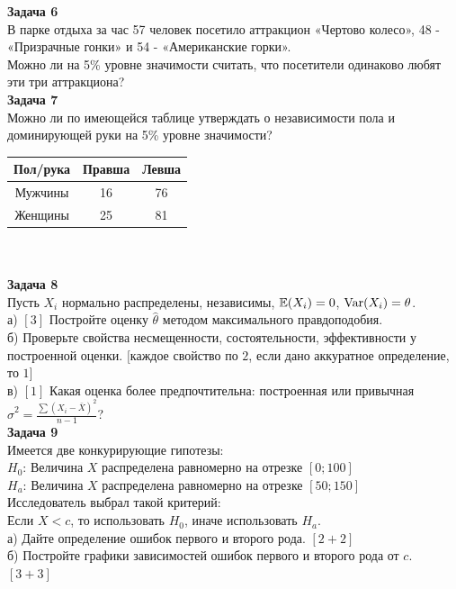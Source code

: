 \documentclass[12pt, a4paper]{article}\usepackage[]{graphicx}\usepackage[]{color}
\begin{document}
	\textbf{Задача 6} \\ %
	В парке отдыха за час 57 человек посетило аттракцион «Чертово
	колесо», 48 - «Призрачные гонки» и 54 - «Американские горки».\\
	Можно ли на 5\% уровне значимости считать, что посетители
	одинаково любят эти три аттракциона? \\

	\textbf{Задача 7} \\ %
	Можно ли по имеющейся таблице утверждать о независимости пола и
	доминирующей руки на 5\% уровне значимости? \\
	\begin{tabular}{|c|c|c|}
		\hline
		Пол/рука & Правша & Левша \\
		\hline
		Мужчины & 16 & 76 \\
		Женщины & 25 & 81 \\
		\hline
	\end{tabular} \\ \\


	\textbf{Задача 8} \\ %
	Пусть $X_{i}$ нормально распределены, независимы, $\mathbb{E}(X_{i})=0$,
	$\operatorname{Var}(X_{i})=\theta$. \\
	а) $[3]$ Постройте оценку $\hat{\theta}$ методом максимального
	правдоподобия. \\
	б) Проверьте свойства несмещенности, состоятельности,
	эффективности у построенной оценки. $[$каждое свойство по $2$, если дано аккуратное определение, то $1]$  \\
	в) $[1]$ Какая оценка более предпочтительна: построенная или
	привычная
	$\hat{\sigma}^{2}=\frac{\sum(X_{i}-\bar{X})^{2}}{n-1}$? \\


	\textbf{Задача 9} \\ %
	Имеется две конкурирующие гипотезы: \\
	$H_{0}$: Величина $X$ распределена равномерно на отрезке $[0;100]$ \\
	$H_{a}$: Величина $X$ распределена равномерно на отрезке $[50;150]$ \\
	Исследователь выбрал такой критерий: \\
	Если $X<c$, то использовать $H_{0}$, иначе использовать $H_{a}$. \\
	а) Дайте определение ошибок первого и второго рода. $[2+2]$ \\
	б) Постройте графики зависимостей ошибок первого и второго рода от
	$c$. $[3+3]$\\
\end{document}
